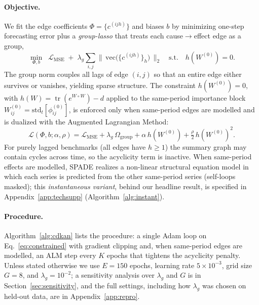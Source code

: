 \paragraph{Objective.}
We fit the edge coefficients $\Phi=\{c^{(ijh)}\}$ and biases $b$ by minimizing
one-step forecasting error plus a \emph{group-lasso} that treats each
cause$\to$effect edge as a group,
\begin{equation}
    \min_{\Phi,b}\;\; \mathcal{L}_{\mathrm{MSE}}
    \;+\; \lambda_{g}\sum_{i,j}\Big\lVert\, \mathrm{vec}\big(\{c^{(ijh)}\}_{h}\big)\,\Big\rVert_2
    \quad \text{s.t.}\quad h(W^{(0)}) = 0 .
    \label{eq:constrained}
\end{equation}
The group norm couples all lags of edge $(i,j)$ so that an entire edge either
survives or vanishes, yielding sparse structure. The constraint
$h(W^{(0)})=0$, with $h(W)=\operatorname{tr}(e^{W\circ W})-d$ applied to the
same-period importance block $W^{(0)}_{ij}=\mathrm{std}_t[\phi^{(0)}_{ij}]$,
is enforced only when same-period edges are modelled and is dualized with the
Augmented Lagrangian Method:
\begin{equation}
    \mathcal{L}(\Phi,b;\alpha,\rho) = \mathcal{L}_{\mathrm{MSE}}
    + \lambda_{g}\,\Omega_{\mathrm{group}}
    + \alpha\, h(W^{(0)}) + \tfrac{\rho}{2}\, h(W^{(0)})^2 .
    \label{eq:alm}
\end{equation}
For purely lagged benchmarks (all edges have $h\!\ge\!1$) the summary graph may
contain cycles across time, so the acyclicity term is inactive. When same-period
effects are modelled, SPADE realizes a non-linear structural equation model in
which each series is predicted from the other same-period series (self-loops
masked); this \emph{instantaneous variant}, behind our headline result, is
specified in Appendix~\ref{app:techsupp} (Algorithm~\ref{alg:instant}).

\paragraph{Procedure.} Algorithm~\ref{alg:cdkan} lists the procedure: a single Adam
loop on Eq.~\eqref{eq:constrained} with gradient clipping and, when same-period
edges are modelled, an ALM step every $K$ epochs that tightens the acyclicity
penalty. Unless stated otherwise we use $E{=}150$ epochs, learning rate
$5\!\times\!10^{-3}$, grid size $G{=}8$, and $\lambda_g{=}10^{-2}$; a sensitivity
analysis over $\lambda_g$ and $G$ is in Section~\ref{sec:sensitivity}, and the
full settings, including how $\lambda_g$ was chosen on held-out data, are in
Appendix~\ref{app:repro}.

